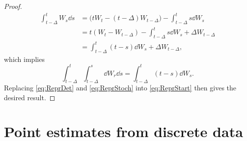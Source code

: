 \documentclass[10pt]{article}
\begin{document}
\begin{proof}
\begin{equation}
	\begin{aligned}
	\int_{t-\Delta}^{t} W_s \dd s &= \big(tW_t - (t-\Delta) W_{t-\Delta}\big) - \int_{t-\Delta}^{t} s \dd W_s\\
	&=  t(W_t - W_{t-\Delta}) - \int_{t-\Delta}^{t} s \dd W_s + \Delta W_{t-\Delta}\\
	&= \int_{t-\Delta}^{t} (t-s) \dd W_s + \Delta  W_{t-\Delta},
	\end{aligned}
	\end{equation}
	which implies
	\begin{equation}\label{eq:ReprStoch}
	\int_{t-\Delta}^{t}\int_{t-\Delta}^s \dd W_r \dd s = \int_{t-\Delta}^{t} (t-s) \dd W_s.
	\end{equation}
	Replacing \eqref{eq:ReprDet} and \eqref{eq:ReprStoch} into \eqref{eq:ReprStart} then gives the desired result.
\end{proof}


\section{Point estimates from discrete data}
\end{document}
